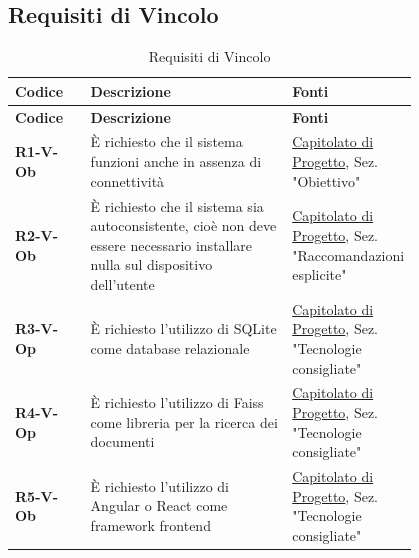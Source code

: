 \documentclass[a4paper,12pt]{article}
\begin{document}
{        \subsection{Requisiti di Vincolo} {
            \begin{longtable}{|l|P{0.5\linewidth}|P{0.3\linewidth}|}
                \caption{Requisiti di Vincolo} \\
                
                \hline
                \textbf{Codice} & \textbf{Descrizione} & \textbf{Fonti} \\
                \hline
                \endfirsthead
                
                \hline
                \textbf{Codice} & \textbf{Descrizione} & \textbf{Fonti} \\
                \hline
                \endhead
                
                \textbf{R1-V-Ob} & È richiesto che il sistema funzioni anche in assenza di connettività & \hyperlink{capitolato}{Capitolato di Progetto}, \newline 
                Sez. "Obiettivo" \\
                \hline
                \textbf{R2-V-Ob} & È richiesto che il sistema sia autoconsistente, cioè non deve essere necessario installare nulla sul dispositivo dell’utente & \hyperlink{capitolato}{Capitolato di Progetto}, \newline 
                Sez. "Raccomandazioni esplicite" \\
                \hline
                \textbf{R3-V-Op} & È richiesto l'utilizzo di SQLite come database relazionale & \hyperlink{capitolato}{Capitolato di Progetto}, \newline 
                Sez. "Tecnologie consigliate" \\
                \hline
                \textbf{R4-V-Op} & È richiesto l'utilizzo di Faiss come libreria per la ricerca dei documenti & \hyperlink{capitolato}{Capitolato di Progetto}, \newline 
                Sez. "Tecnologie consigliate" \\
                \hline
                \textbf{R5-V-Ob} & È richiesto l'utilizzo di Angular o React come framework frontend & \hyperlink{capitolato}{Capitolato di Progetto}, \newline 
                Sez. "Tecnologie consigliate" \\
                \hline
            \end{longtable}
        }

}
\end{document}
